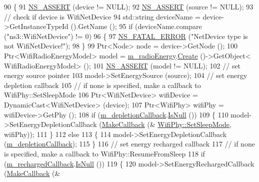 \begin{DoxyCode}
90 \{
91   \hyperlink{assert_8h_a6dccdb0de9b252f60088ce281c49d052}{NS\_ASSERT} (device != NULL);
92   \hyperlink{assert_8h_a6dccdb0de9b252f60088ce281c49d052}{NS\_ASSERT} (source != NULL);
93   \textcolor{comment}{// check if device is WifiNetDevice}
94   std::string deviceName = device->GetInstanceTypeId ().GetName ();
95   \textcolor{keywordflow}{if} (deviceName.compare (\textcolor{stringliteral}{"ns3::WifiNetDevice"}) != 0)
96     \{
97       \hyperlink{group__fatal_ga5131d5e3f75d7d4cbfd706ac456fdc85}{NS\_FATAL\_ERROR} (\textcolor{stringliteral}{"NetDevice type is not WifiNetDevice!"});
98     \}
99   Ptr<Node> node = device->GetNode ();
100   Ptr<WifiRadioEnergyModel> model = \hyperlink{classns3_1_1WifiRadioEnergyModelHelper_aa69c0d9a84c1b1789df311f45eb29966}{m\_radioEnergy}.\hyperlink{classns3_1_1ObjectFactory_a18152e93f0a6fe184ed7300cb31e9896}{Create} ()->GetObject<
      WifiRadioEnergyModel> ();
101   \hyperlink{assert_8h_a6dccdb0de9b252f60088ce281c49d052}{NS\_ASSERT} (model != NULL);
102   \textcolor{comment}{// set energy source pointer}
103   model->SetEnergySource (source);
104   \textcolor{comment}{// set energy depletion callback}
105   \textcolor{comment}{// if none is specified, make a callback to WifiPhy::SetSleepMode}
106   Ptr<WifiNetDevice> wifiDevice = DynamicCast<WifiNetDevice> (device);
107   Ptr<WifiPhy> wifiPhy = wifiDevice->GetPhy ();
108   \textcolor{keywordflow}{if} (\hyperlink{classns3_1_1WifiRadioEnergyModelHelper_a8a6969b2f4b0e568330284b8ea29bb35}{m\_depletionCallback}.\hyperlink{classns3_1_1Callback_aa8e27826badbf37f84763f36f70d9b54}{IsNull} ())
109     \{
110       model->SetEnergyDepletionCallback (\hyperlink{group__makecallbackmemptr_ga9376283685aa99d204048d6a4b7610a4}{MakeCallback} (&
      \hyperlink{classns3_1_1WifiPhy_a6d10a0cf24eef88269b69eb10d2fc139}{WifiPhy::SetSleepMode}, wifiPhy));
111     \}
112   \textcolor{keywordflow}{else}
113     \{
114       model->SetEnergyDepletionCallback (\hyperlink{classns3_1_1WifiRadioEnergyModelHelper_a8a6969b2f4b0e568330284b8ea29bb35}{m\_depletionCallback});
115     \}
116   \textcolor{comment}{// set energy recharged callback}
117   \textcolor{comment}{// if none is specified, make a callback to WifiPhy::ResumeFromSleep}
118   \textcolor{keywordflow}{if} (\hyperlink{classns3_1_1WifiRadioEnergyModelHelper_a7ef62c4c3b8605a1d9b1d828a3beef59}{m\_rechargedCallback}.\hyperlink{classns3_1_1Callback_aa8e27826badbf37f84763f36f70d9b54}{IsNull} ())
119     \{
120       model->SetEnergyRechargedCallback (\hyperlink{group__makecallbackmemptr_ga9376283685aa99d204048d6a4b7610a4}{MakeCallback} (&

\end{DoxyCode}
